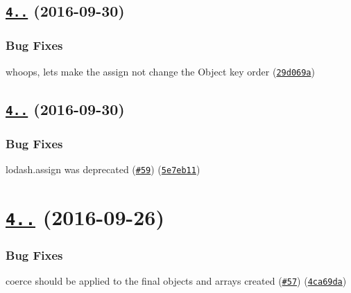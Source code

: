 \label{_4.0.2}%
 \subsection*{\href{https://github.com/yargs/yargs-parser/compare/v4.0.1...v4.0.2}{\tt 4..} (2016-\/09-\/30)}

\subsubsection*{Bug Fixes}


\begin{DoxyItemize}
\item whoops, let\textquotesingle{}s make the assign not change the Object key order (\href{https://github.com/yargs/yargs-parser/commit/29d069a}{\tt 29d069a})
\end{DoxyItemize}

\label{_4.0.1}%
 \subsection*{\href{https://github.com/yargs/yargs-parser/compare/v4.0.0...v4.0.1}{\tt 4..} (2016-\/09-\/30)}

\subsubsection*{Bug Fixes}


\begin{DoxyItemize}
\item lodash.\+assign was deprecated (\href{https://github.com/yargs/yargs-parser/issues/59}{\tt \#59}) (\href{https://github.com/yargs/yargs-parser/commit/5e7eb11}{\tt 5e7eb11})
\end{DoxyItemize}

\label{_4.0.0}%
 \section*{\href{https://github.com/yargs/yargs-parser/compare/v3.2.0...v4.0.0}{\tt 4..} (2016-\/09-\/26)}

\subsubsection*{Bug Fixes}


\begin{DoxyItemize}
\item coerce should be applied to the final objects and arrays created (\href{https://github.com/yargs/yargs-parser/issues/57}{\tt \#57}) (\href{https://github.com/yargs/yargs-parser/commit/4ca69da}{\tt 4ca69da})
\end{DoxyItemize}

